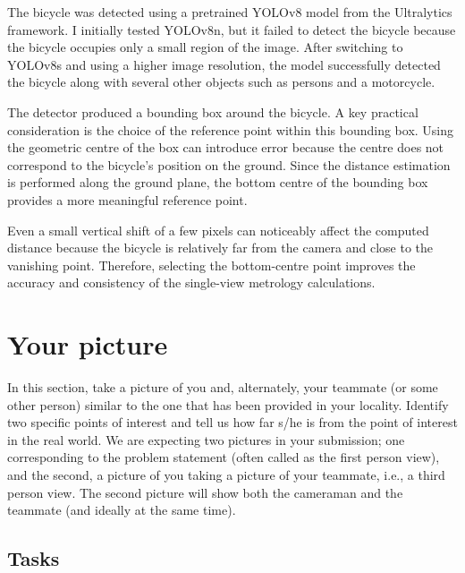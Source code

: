 \begin{studentSpace}


The bicycle was detected using a pretrained YOLOv8 model from the Ultralytics framework. I initially tested YOLOv8n, but it failed to detect the bicycle because the bicycle occupies only a small region of the image. After switching to YOLOv8s and using a higher image resolution, the model successfully detected the bicycle along with several other objects such as persons and a motorcycle.

The detector produced a bounding box around the bicycle. A key practical consideration is the choice of the reference point within this bounding box. Using the geometric centre of the box can introduce error because the centre does not correspond to the bicycle's position on the ground. Since the distance estimation is performed along the ground plane, the bottom centre of the bounding box provides a more meaningful reference point.

Even a small vertical shift of a few pixels can noticeably affect the computed distance because the bicycle is relatively far from the camera and close to the vanishing point. Therefore, selecting the bottom-centre point improves the accuracy and consistency of the single-view metrology calculations.
\end{studentSpace}


\section{Your picture}

In this section, take a picture of you and, alternately, your teammate
(or some other person) similar to the one that has been provided in
your locality. Identify two specific points of interest and tell us
how far s/he is from the point of interest in the real world. We are
expecting two pictures in your submission; one corresponding to the
problem statement (often called as the first person view), and the
second, a picture of you taking a picture of your teammate, i.e., a
third person view. The second picture will show both the cameraman and
the teammate (and ideally at the same time).

\subsection{Tasks}

